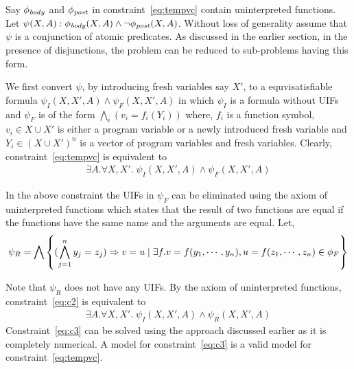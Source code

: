 \documentclass[a4paper,10pt]{article}
\begin{document}

Say $\mathit{\phi_{body}}$ and $\mathit{\phi_{post}}$ in constraint~\ref{eq:tempvc} contain uninterpreted functions.
Let $\psi(X,A): \mathit{\phi_{body}}(X,A) \wedge \neg \mathit{\phi_{post}}(X,A)$.
Without loss of generality assume that $\psi$ is a conjunction of atomic predicates.
As discussed in the earlier section, in the presence of disjunctions,  the problem can be reduced to sub-problems having this form.

We first convert $\psi$, by introducing fresh variables say $X'$, 
to a equvisatisfiable formula $\psi_{I}(X,X',A) \wedge \psi_{F}(X,X',A)$ in which
$\psi_I$ is a formula without UIFs and 
$\psi_{F}$ is of the form $\bigwedge_i (v_i = f_i(Y_i))$ where, $f_i$ is a function symbol,  
$v_i \in X \cup X'$ is either a program variable or a newly introduced fresh variable 
and $Y_i \in (X \cup X')^n$ is a vector of program variables and fresh variables.  
Clearly, constraint~\ref{eq:tempvc} is equivalent to 
%
\begin{align}
\exists A. \forall X,X'. \; \psi_{I}(X,X',A) \wedge \psi_{F}(X,X',A) \label{eq:c2}
\end{align}

In the above constraint the UIFs in $\psi_{F}$ can be eliminated using the axiom of uninterpreted functions which states that the result of  two functions are equal if the functions have the same name and the arguments are equal. 
Let,
\begin{align}
\psi_R = \bigwedge \left\lbrace (\bigwedge \limits_{j=1}^{n} y_j = z_j) \Rightarrow v = u \; | \; \exists f. v = f(y_1,\cdots,y_n), u = f(z_1,\cdots,z_n) \in \phi_F \right\rbrace
\end{align}

Note that $\psi_R$ does not have any UIFs. By the axiom of uninterpreted functions,  constraint~\ref{eq:c2} is equivalent to 
%
\begin{align}
\exists A. \forall X,X'. \; \psi_{I}(X,X',A) \wedge \psi_{R}(X,X',A) \label{eq:c3}
\end{align}
%
Constraint~\ref{eq:c3} can be solved using the approach discussed earlier as it is completely numerical. A model for constraint~\ref{eq:c3} is a valid model for constraint~\ref{eq:tempvc}.




\end{document}
